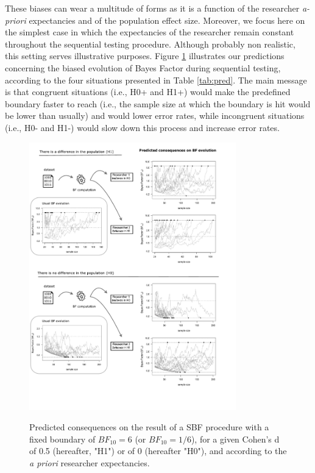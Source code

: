 \documentclass[a4paper,man,natbib,floatsintext,donotrepeattitle]{apa6}
\begin{document}
These biases can wear a multitude of forms as it is a function of the researcher \textit{a-priori} expectancies and of the population effect size. Moreover, we focus here on the simplest case in which the expectancies of the researcher remain constant throughout the sequential testing procedure. Although probably non realistic, this setting serves illustrative purposes. Figure \ref{fig:pred} illustrates our predictions concerning the biased evolution of Bayes Factor during sequential testing, according to the four situations presented in Table \ref{tab:pred}. The main message is that congruent situations (i.e., H0+ and H1+) would make the predefined boundary faster to reach (i.e., the sample size at which the boundary is hit would be lower than usually) and would lower error rates, while incongruent situations (i.e., H0- and H1-) would slow down this process and increase error rates.

\begin{figure}[H]
  \caption{Predicted consequences on the result of a SBF procedure with a fixed boundary of $BF_{10} = 6$ (or $BF_{10} = 1/6$), for a given Cohen's d of 0.5 (hereafter, "H1") or of 0 (hereafter "H0"), and according to the \emph{a priori} researcher expectancies.}
  \centering
  \includegraphics[width=0.8\textwidth]{figures/BFF_predictions.pdf}
  \label{fig:pred}
\end{figure}
\end{document}
